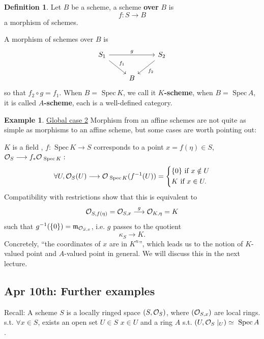 \documentclass[11pt]{article}
\theoremstyle{definition}
\newtheorem{dfn}[thm]{Definition}
\newtheorem{ex}[thm]{Example}
\newcommand{\spec}{\text{ Spec}\,}
\newcommand{\scm}{{\mathfrak m}}
\newcommand{\calo}{{\cal O}}
\newcommand{\lrta}{\longrightarrow}
\begin{document}
\begin{dfn}
Let $B$ be a scheme, a scheme \textbf{over } $B$ is 
$$
f:S\lrta B
$$
a morphism of schemes.

A morphism of schemes over $B$ is 
$$
\begin{tikzcd}
S_1 \arrow[rd, "f_1"] \arrow[rr, "g"] &  & S_2 \arrow[ld, "f_2"] \\
 & B & 
\end{tikzcd}
$$
so that $f_2\circ g=f_1$. When $B=\spec K$, we call it \textbf{$K$-scheme}, when $B=\spec A$, it is called \textbf{$A$-scheme}, each is a well-defined category.
\end{dfn}
\begin{ex}
\underline{Global case 2} Morphism from an affine schemes are not quite as simple as morphisms to an affine scheme, but some cases are worth pointing out:

 $K$ is a field , $f:\spec K\lrta S$ corresponds to a point $x=f(\eta)\in S$, $\calo_S\lrta f_*\calo_{\spec K}:$ $$
\forall U,\calo_S(U)\lrta \calo_{\spec K}(f^{-1}(U))=\left\{\begin{aligned}
&\{0\}\text{ if }x\notin U\\
& K\text{ if } x\in U.
\end{aligned}
\right.$$
Compatibility with restrictions show that this is equivalent to
$$
\calo_{S,f(\eta)}=\calo_{S,x}\overset{g}{\lrta}\calo_{K,\eta}=K
$$
such that $g^{-1}(\{0\})=\scm_{\calo_{S,x}}$, i.e.
$g$ passes to the quotient
$$
\kappa_S\lrta K.
$$
Concretely, ``the coordinates of $x$ are in $K^n$'', which leads us to the notion of $K$-valued point and $A$-valued point in general. We will discuss this in the next lecture.
\end{ex}

\subsection{Apr 10th: Further examples }
Recall: A scheme $S$ is a  locally ringed space $(S,\calo_S)$, where $(\calo_{S,x})$ are local rings. s.t. $\forall x\in S$, exists an open set $U\in S$ $x\in U$ and a ring $A$ s.t. 
$(U,\calo_{S}\mid_U)\simeq \spec A$.
\end{document}

